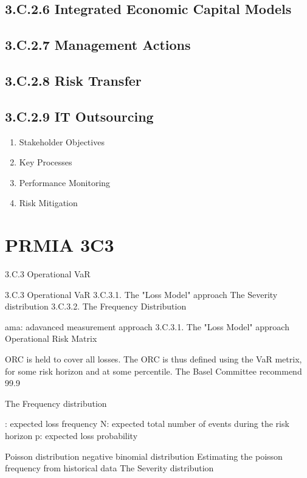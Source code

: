 \documentclass[12pt]{article}
\begin{document}
\subsection*{3.C.2.6 Integrated Economic Capital Models}


\subsection*{3.C.2.7 Management Actions}

\subsection*{3.C.2.8 Risk Transfer}


\subsection*{3.C.2.9 IT Outsourcing}

\begin{enumerate}
\item Stakeholder Objectives
\item Key Processes
\item Performance Monitoring
\item Risk Mitigation
\end{enumerate}

\newpage
\section{PRMIA 3C3}
 
3.C.3 Operational VaR

3.C.3 Operational VaR
3.C.3.1. The "Loss Model" approach
The Severity distribution
3.C.3.2. The Frequency Distribution





ama: adavanced measurement approach
3.C.3.1. The "Loss Model" approach
Operational Risk Matrix
 
ORC is held to cover all losses.
The ORC is thus defined using the VaR metrix, for some risk horizon and at some percentile.
The Basel Committee recommend 99.9%
 
The Frequency distribution

: expected loss frequency
N: expected total number of events during the risk horizon
p: expected loss probability
 
Poisson distribution
negative binomial distribution
Estimating the poisson frequency from historical data
The Severity distribution
 
\end{document}
